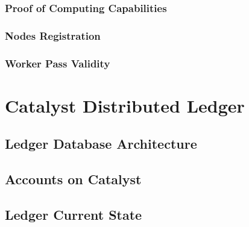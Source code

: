 \documentclass[a4paper, 12pt]{book}
\begin{document}
\subsection{Proof of Computing Capabilities}\label{Sec:Pcc}



\subsection{Nodes Registration}\label{Sec:Reg}



\subsection{Worker Pass Validity}\label{Sec:PassVal}






\chapter{Catalyst Distributed Ledger} \label{Cha:LDA}


\section{Ledger Database Architecture} \label{Sec:LDA}



\section{Accounts on Catalyst} \label{Sec:AoC}



\section{Ledger Current State}\label{SecLCS}
\end{document}
